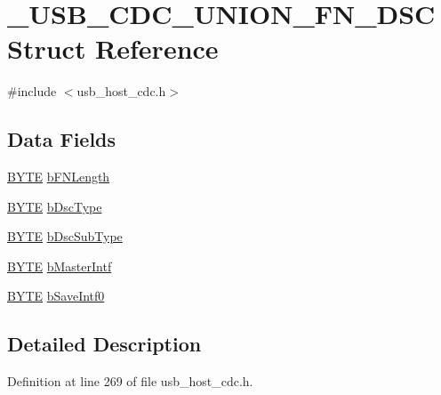 \hypertarget{struct___u_s_b___c_d_c___u_n_i_o_n___f_n___d_s_c}{}\section{\+\_\+\+U\+S\+B\+\_\+\+C\+D\+C\+\_\+\+U\+N\+I\+O\+N\+\_\+\+F\+N\+\_\+\+D\+S\+C Struct Reference}
\label{struct___u_s_b___c_d_c___u_n_i_o_n___f_n___d_s_c}


{\ttfamily \#include $<$usb\+\_\+host\+\_\+cdc.\+h$>$}

\subsection*{Data Fields}
\begin{DoxyCompactItemize}
\item 
\hyperlink{_generic_type_defs_8h_a4ae1dab0fb4b072a66584546209e7d58}{B\+Y\+T\+E} \hyperlink{struct___u_s_b___c_d_c___u_n_i_o_n___f_n___d_s_c_a5cba7e463fbde92bb6daf4547a127a28}{b\+F\+N\+Length}
\item 
\hyperlink{_generic_type_defs_8h_a4ae1dab0fb4b072a66584546209e7d58}{B\+Y\+T\+E} \hyperlink{struct___u_s_b___c_d_c___u_n_i_o_n___f_n___d_s_c_a3641ecfd04e86c3ce95c6bed0c066a5d}{b\+Dsc\+Type}
\item 
\hyperlink{_generic_type_defs_8h_a4ae1dab0fb4b072a66584546209e7d58}{B\+Y\+T\+E} \hyperlink{struct___u_s_b___c_d_c___u_n_i_o_n___f_n___d_s_c_ac65bb2d41adfb877a46a2c45d2a1cb72}{b\+Dsc\+Sub\+Type}
\item 
\hyperlink{_generic_type_defs_8h_a4ae1dab0fb4b072a66584546209e7d58}{B\+Y\+T\+E} \hyperlink{struct___u_s_b___c_d_c___u_n_i_o_n___f_n___d_s_c_aefe11dee2e95d1c4ef5715e4face1acf}{b\+Master\+Intf}
\item 
\hyperlink{_generic_type_defs_8h_a4ae1dab0fb4b072a66584546209e7d58}{B\+Y\+T\+E} \hyperlink{struct___u_s_b___c_d_c___u_n_i_o_n___f_n___d_s_c_a4db1c24396728ae8cb7b819d13f7b10d}{b\+Save\+Intf0}
\end{DoxyCompactItemize}


\subsection{Detailed Description}


Definition at line 269 of file usb\+\_\+host\+\_\+cdc.\+h.



